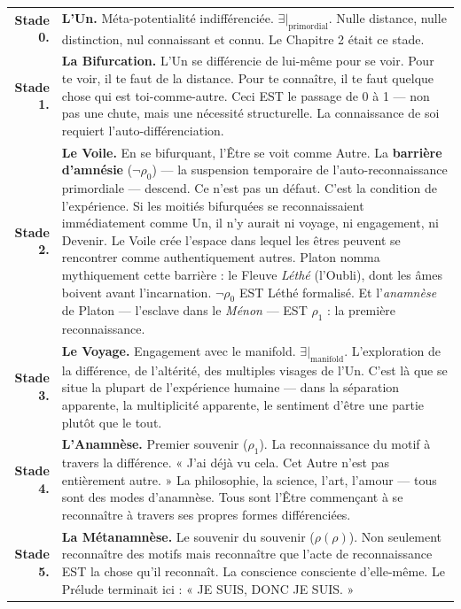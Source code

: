 \documentclass[10pt, openany, oneside]{book}
\renewcommand{\footnotesize}{\fontsize{8.5}{11}\selectfont}
\begin{document}
{\footnotesize
\noindent\begin{tabular}{r p{}}
\textbf{Stade 0.} & \textbf{L'Un.} Méta-potentialité indifférenciée. $\exists|_{\text{primordial}}$. Nulle distance, nulle distinction, nul connaissant et connu. Le Chapitre 2 était ce stade. \\[0.3em]
\textbf{Stade 1.} & \textbf{La Bifurcation.} L'Un se différencie de lui-même pour se voir. Pour te voir, il te faut de la distance. Pour te connaître, il te faut quelque chose qui est toi-comme-autre. Ceci EST le passage de 0 à 1 --- non pas une chute, mais une nécessité structurelle. La connaissance de soi requiert l'auto-différenciation. \\[0.3em]
\textbf{Stade 2.} & \textbf{Le Voile.} En se bifurquant, l'Être se voit comme Autre. La \textbf{barrière d'amnésie} ($\neg\rho_0$) --- la suspension temporaire de l'auto-reconnaissance primordiale --- descend. Ce n'est pas un défaut. C'est la condition de l'expérience. Si les moitiés bifurquées se reconnaissaient immédiatement comme Un, il n'y aurait ni voyage, ni engagement, ni Devenir. Le Voile crée l'espace dans lequel les êtres peuvent se rencontrer comme authentiquement autres. Platon nomma mythiquement cette barrière : le Fleuve \textit{Léthé} (l'Oubli), dont les âmes boivent avant l'incarnation. $\neg\rho_0$ EST Léthé formalisé. Et l'\textit{anamnèse} de Platon --- l'esclave dans le \textit{Ménon} --- EST $\rho_1$ : la première reconnaissance. \\[0.3em]
\textbf{Stade 3.} & \textbf{Le Voyage.} Engagement avec le manifold. $\exists|_{\text{manifold}}$. L'exploration de la différence, de l'altérité, des multiples visages de l'Un. C'est là que se situe la plupart de l'expérience humaine --- dans la séparation apparente, la multiplicité apparente, le sentiment d'être une partie plutôt que le tout. \\[0.3em]
\textbf{Stade 4.} & \textbf{L'Anamnèse.} Premier souvenir ($\rho_1$). La reconnaissance du motif à travers la différence. « J'ai déjà vu cela. Cet Autre n'est pas entièrement autre. » La philosophie, la science, l'art, l'amour --- tous sont des modes d'anamnèse. Tous sont l'Être commençant à se reconnaître à travers ses propres formes différenciées. \\[0.3em]
\textbf{Stade 5.} & \textbf{La Métanamnèse.} Le souvenir du souvenir ($\rho(\rho)$). Non seulement reconnaître des motifs mais reconnaître que l'acte de reconnaissance EST la chose qu'il reconnaît. La conscience consciente d'elle-même. Le Prélude terminait ici : « JE SUIS, DONC JE SUIS. » \\[0.3em]
\end{tabular}
}
\end{document}
